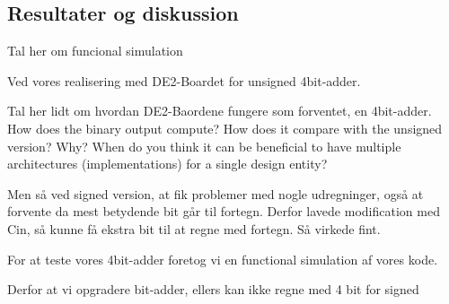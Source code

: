 \documentclass[../journal2.tex]{subfiles}
\begin{document}
\begin{table}[H]
    \centering
      \framebox{
        \rule{8pt}{0pt}
          
  }
  \caption{Kode for 4bit-adder med unsigned og signed architecture, c\textunderscore in}	
  \label{src:Tab4}
\end{table}


\subsection{Resultater og diskussion}

Tal her om funcional simulation

Ved vores realisering med DE2-Boardet for unsigned 4bit-adder.



Tal her lidt om hvordan DE2-Baordene fungere som forventet, en 4bit-adder. How does the binary output compute? How does it compare
with the unsigned version? Why? When do you think it can be beneficial to have
multiple architectures (implementations) for a single design entity?

Men så ved signed version, at fik problemer med nogle udregninger, også at forvente da mest betydende bit går til fortegn. Derfor lavede modification med Cin, så kunne få ekstra bit til at regne  med fortegn. Så virkede fint.





For at teste vores 4bit-adder foretog vi en functional simulation af vores kode. 

Derfor at vi opgradere bit-adder, ellers kan ikke regne med 4 bit for signed
\end{document}
